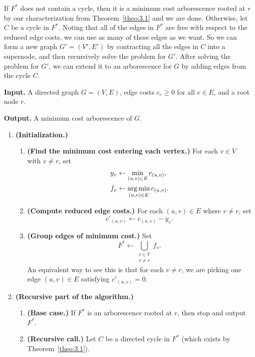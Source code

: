 If $F^*$ does not contain a cycle, then it is a minimum cost arborescence 
rooted at $r$ by our characterization from Theorem~\ref{theo:3.1} and 
we are done. Otherwise, let $C$ be a cycle in $F^*$. Noting that all 
of the edges in $F^*$ are free with respect to the reduced edge costs, we can 
use as many of these edges as we want. So we can form a new graph 
$G' = (V', E')$ by contracting all the edges in $C$ into a supernode, and 
then recursively solve the problem for $G'$. After solving the problem 
for $G'$, we can extend it to an arborescence for $G$ by adding edges 
from the cycle $C$.

\begin{mdframed}[
    linewidth=1pt,
    linecolor=black,
    bottomline=false,topline=false,rightline=false,
    innerrightmargin=0pt,innertopmargin=0pt,innerbottommargin=0pt,
    innerleftmargin=1em,%
    skipabove=0.75\baselineskip
]
{\bf Input.} A directed graph $G = (V, E)$, edge costs $c_e \geq 0$ for 
all $e \in E$, and a root node $r$. 

{\bf Output.} A minimum cost arborescence of $G$. 
\begin{enumerate}[leftmargin=1.75cm, label={Step \arabic*.}]
    \item {\bf (Initialization.)} 
    \begin{enumerate}[label={Step 1.\arabic*.}]
        \item {\bf (Find the minimum cost entering each vertex.)} 
        For each $v \in V$ with $v \neq r$, set 
        \begin{align*}
            y_v &\gets \min_{(u, v) \in E} c_{(u, v)}, \\ 
            f_v &\gets \operatorname*{arg\,min}_{(u, v) \in E} c_{(u, v)}. 
        \end{align*}
        \item {\bf (Compute reduced edge costs.)} For each $(u, v) \in E$ 
        where $v \neq r$, set 
        \[ c'_{(u, v)} \gets c_{(u, v)} - y_v. \] 
        \item {\bf (Group edges of minimum cost.)} Set 
        \[ F^* \gets \bigcup_{\substack{v\in V\\ v\neq r}} f_v. \] 
        An equivalent way to see this is that for each $v \neq r$, we are picking 
        one edge $(u, v) \in E$ satisfying $c'_{(u,v)} = 0$.  
    \end{enumerate}

    \item {\bf (Recursive part of the algorithm.)}
    \begin{enumerate}[label={Step 2.\arabic*.}]
        \item {\bf (Base case.)} If $F^*$ is an arborescence rooted at $r$, 
        then stop and output $F^*$.
        \item {\bf (Recursive call.)} Let $C$ be a directed cycle in $F^*$
        (which exists by Theorem~\ref{theo:3.1}). 
        

\end{enumerate}
\end{enumerate}
\end{mdframed}

